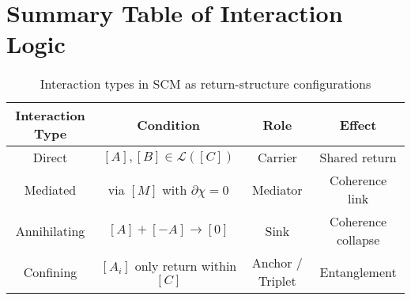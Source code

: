 \section{Summary Table of Interaction Logic} \label{sec:interaction-summary}

\begin{table}[h!]
\centering
\begin{tabular}{|c|c|c|c|}
\hline
\textbf{Interaction Type} & \textbf{Condition} & \textbf{Role} & \textbf{Effect} \\
\hline
Direct        & $[A], [B] \in \mathcal{L}([C])$           & Carrier          & Shared return \\
Mediated      & via $[M]$ with $\partial \chi = 0$        & Mediator         & Coherence link \\
Annihilating  & $[A] + [-A] \rightarrow [0]$              & Sink             & Coherence collapse \\
Confining     & $[A_i]$ only return within $[C]$          & Anchor / Triplet & Entanglement \\
\hline
\end{tabular}
\caption{Interaction types in SCM as return-structure configurations}
\end{table}

